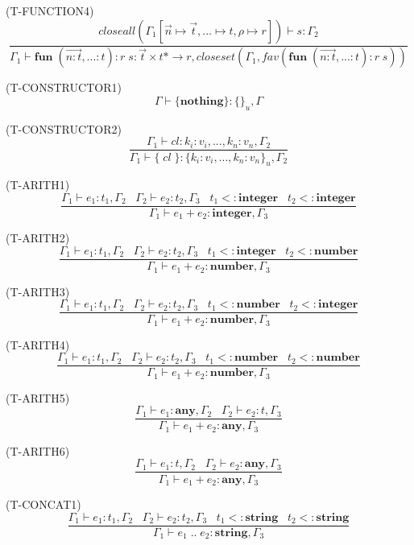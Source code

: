 \documentclass{paper}
\newcommand{\Any}{\mathbf{any}}
\newcommand{\Integer}{\mathbf{integer}}
\newcommand{\Number}{\mathbf{number}}
\newcommand{\String}{\mathbf{string}}
\newcommand{\mylabel}[1]{\; (\textsc{#1})}
\newcommand{\env}{\Gamma}
\newcommand{\subtype}{<:}
\newcommand{\ret}{\rho}
\begin{document}
\mylabel{T-FUNCTION4}
\[
\dfrac{closeall(\env_{1}[\vec{n} \mapsto \vec{t}, {...} \mapsto t, \ret \mapsto r]) \vdash s:\env_{2}}
      {\env_{1} \vdash \mathbf{fun} \; (\vec{n{:}t},{...}{:}t){:}r \; s: \vec{t} \times t{*} \rightarrow r, closeset(\env_{1}, fav(\mathbf{fun} \; (\vec{n{:}t},{...}{:}t){:}r \; s))}
\]

\mylabel{T-CONSTRUCTOR1}
\[
\env \vdash \{ \mathbf{nothing} \}:\{ \}_{u}, \env 
\]

\mylabel{T-CONSTRUCTOR2}
\[
\dfrac{\env_{1} \vdash cl:k_{i}{:}v_{i}, ..., k_{n}{:}v_{n}, \env_{2}}
      {\env_{1} \vdash \{ \; cl \; \}:\{ k_{i}{:}v_{i}, ..., k_{n}{:}v_{n} \}_{u}, \env_{2}}
\]

\mylabel{T-ARITH1}
\[
\dfrac{\env_{1} \vdash e_{1}:t_{1}, \env_{2} \;\;\;
       \env_{2} \vdash e_{2}:t_{2}, \env_{3} \;\;\;
       t_{1} \subtype \Integer \;\;\;
       t_{2} \subtype \Integer}
      {\env_{1} \vdash e_{1} + e_{2}:\Integer, \env_{3}}
\]

\mylabel{T-ARITH2}
\[
\dfrac{\env_{1} \vdash e_{1}:t_{1}, \env_{2} \;\;\;
       \env_{2} \vdash e_{2}:t_{2}, \env_{3} \;\;\;
       t_{1} \subtype \Integer \;\;\;
       t_{2} \subtype \Number}
      {\env_{1} \vdash e_{1} + e_{2}:\Number, \env_{3}}
\]

\mylabel{T-ARITH3}
\[
\dfrac{\env_{1} \vdash e_{1}:t_{1}, \env_{2} \;\;\;
       \env_{2} \vdash e_{2}:t_{2}, \env_{3} \;\;\;
       t_{1} \subtype \Number \;\;\;
       t_{2} \subtype \Integer}
      {\env_{1} \vdash e_{1} + e_{2}:\Number, \env_{3}}
\]

\mylabel{T-ARITH4}
\[
\dfrac{\env_{1} \vdash e_{1}:t_{1}, \env_{2} \;\;\;
       \env_{2} \vdash e_{2}:t_{2}, \env_{3} \;\;\;
       t_{1} \subtype \Number \;\;\;
       t_{2} \subtype \Number}
      {\env_{1} \vdash e_{1} + e_{2}:\Number, \env_{3}}
\]

\mylabel{T-ARITH5}
\[
\dfrac{\env_{1} \vdash e_{1}:\Any, \env_{2} \;\;\;
       \env_{2} \vdash e_{2}:t, \env_{3}}
      {\env_{1} \vdash e_{1} + e_{2}:\Any, \env_{3}}
\]

\mylabel{T-ARITH6}
\[
\dfrac{\env_{1} \vdash e_{1}:t, \env_{2} \;\;\;
       \env_{2} \vdash e_{2}:\Any, \env_{3}}
      {\env_{1} \vdash e_{1} + e_{2}:\Any, \env_{3}}
\]

\mylabel{T-CONCAT1}
\[
\dfrac{\env_{1} \vdash e_{1}:t_{1}, \env_{2} \;\;\;
       \env_{2} \vdash e_{2}:t_{2}, \env_{3} \;\;\;
       t_{1} \subtype \String \;\;\;
       t_{2} \subtype \String}
      {\env_{1} \vdash e_{1} \; {..} \; e_{2}:\String, \env_{3}}
\]
\end{document}
